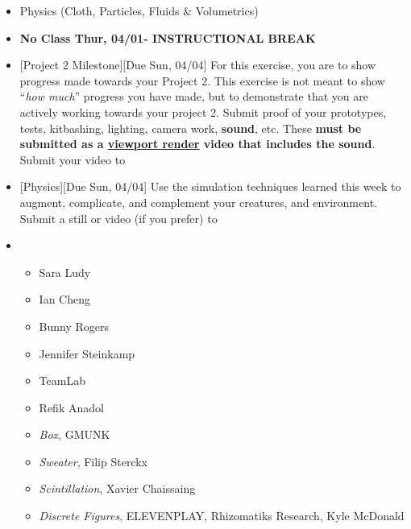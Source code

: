 \def\dMon{Mon, 03/29}
\def\dTues{Tues, 03/30}
\def\dWed{Wed, 03/31}
\def\dThur{Thur, 04/01}
\def\dFri{Fri, 04/02}
\def\dSat{Sat, 04/03}
\def\dSun{Sun, 04/04}
\placeDate

\begin{itemize}[noitemsep,topsep=0pt,leftmargin=*]
    \item {} Physics (Cloth, Particles, Fluids \& Volumetrics)
    \item \textcolor{defaultColor}{\textbf{No Class \dThur - INSTRUCTIONAL BREAK}}
    \item {}[Project 2 Milestone][Due \dSun] For this exercise, you are to show progress made towards your Project 2. This exercise is not meant to show ``\emph{how much}'' progress you have made, but to demonstrate that you are actively working towards your project 2. Submit proof of your prototypes, tests, kitbashing, lighting, camera work, \textbf{sound}, etc. These \textbf{must be submitted as a \href{https://docs.blender.org/manual/en/latest/editors/3dview/viewport_render.html}{viewport render} video that includes the sound}. Submit your video to \discordE
    \item {}[Physics][Due \dSun] Use the simulation techniques learned this week to augment, complicate, and complement your creatures, and environment. Submit a still or video (if you prefer) to \discordC
    \item {}
    \begin{itemize}
        \item Sara Ludy
        \item Ian Cheng
        \item Bunny Rogers
        \item Jennifer Steinkamp
        \item TeamLab
        \item Refik Anadol
        \item \emph{Box}, GMUNK
        \item \emph{Sweater}, Filip Sterckx
        \item \emph{Scintillation}, Xavier Chaissaing
        \item \emph{Discrete Figures}, ELEVENPLAY, Rhizomatiks Research, Kyle McDonald
    \end{itemize}
\end{itemize}